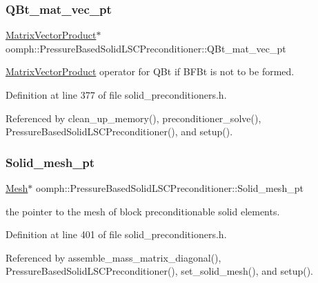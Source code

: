 \subsubsection{\texorpdfstring{Q\+Bt\+\_\+mat\+\_\+vec\+\_\+pt}{QBt\_mat\_vec\_pt}}
{\footnotesize\ttfamily \hyperlink{classoomph_1_1MatrixVectorProduct}{Matrix\+Vector\+Product}$\ast$ oomph\+::\+Pressure\+Based\+Solid\+L\+S\+C\+Preconditioner\+::\+Q\+Bt\+\_\+mat\+\_\+vec\+\_\+pt\hspace{0.3cm}{\ttfamily [private]}}



\hyperlink{classoomph_1_1MatrixVectorProduct}{Matrix\+Vector\+Product} operator for Q\+Bt if B\+F\+Bt is not to be formed. 



Definition at line 377 of file solid\+\_\+preconditioners.\+h.



Referenced by clean\+\_\+up\+\_\+memory(), preconditioner\+\_\+solve(), Pressure\+Based\+Solid\+L\+S\+C\+Preconditioner(), and setup().

\mbox{\label{classoomph_1_1PressureBasedSolidLSCPreconditioner_aa14db4490d9ce73788e22bc3d465489b}} 
\subsubsection{\texorpdfstring{Solid\+\_\+mesh\+\_\+pt}{Solid\_mesh\_pt}}
{\footnotesize\ttfamily \hyperlink{classoomph_1_1Mesh}{Mesh}$\ast$ oomph\+::\+Pressure\+Based\+Solid\+L\+S\+C\+Preconditioner\+::\+Solid\+\_\+mesh\+\_\+pt\hspace{0.3cm}{\ttfamily [private]}}



the pointer to the mesh of block preconditionable solid elements. 



Definition at line 401 of file solid\+\_\+preconditioners.\+h.



Referenced by assemble\+\_\+mass\+\_\+matrix\+\_\+diagonal(), Pressure\+Based\+Solid\+L\+S\+C\+Preconditioner(), set\+\_\+solid\+\_\+mesh(), and setup().


